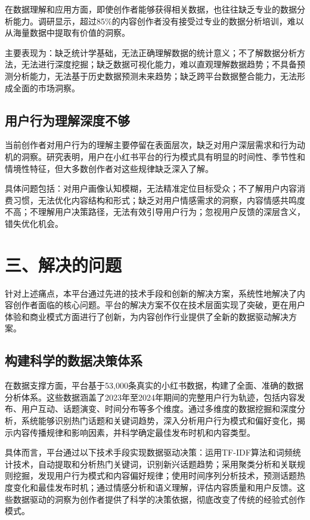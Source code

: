 \documentclass[12pt,a4paper]{article}
\begin{document}
在数据理解和应用方面，即使创作者能够获得相关数据，也往往缺乏专业的数据分析能力。调研显示，超过85\%的内容创作者没有接受过专业的数据分析培训，难以从海量数据中提取有价值的洞察。

主要表现为：缺乏统计学基础，无法正确理解数据的统计意义；不了解数据分析方法，无法进行深度挖掘；缺乏数据可视化能力，难以直观理解数据趋势；不具备预测分析能力，无法基于历史数据预测未来趋势；缺乏跨平台数据整合能力，无法形成全面的市场洞察。

\subsection{用户行为理解深度不够}

当前创作者对用户行为的理解主要停留在表面层次，缺乏对用户深层需求和行为动机的洞察\cite{user-behavior-analysis}。研究表明，用户在小红书平台的行为模式具有明显的时间性、季节性和情境性特征，但大多数创作者对这些规律缺乏深入了解。

具体问题包括：对用户画像认知模糊，无法精准定位目标受众；不了解用户内容消费习惯，无法优化内容结构和形式；缺乏对用户情感需求的洞察，内容情感共鸣度不高；不理解用户决策路径，无法有效引导用户行为；忽视用户反馈的深层含义，错失优化机会。

\section*{三、解决的问题}
\setcounter{section}{3}

针对上述痛点，本平台通过先进的技术手段和创新的解决方案，系统性地解决了内容创作者面临的核心问题。平台的解决方案不仅在技术层面实现了突破，更在用户体验和商业模式方面进行了创新，为内容创作行业提供了全新的数据驱动解决方案。

\subsection{构建科学的数据决策体系}

在数据支撑方面，平台基于53,000条真实的小红书数据，构建了全面、准确的数据分析体系。这些数据涵盖了2023年至2024年期间的完整用户行为轨迹，包括内容发布、用户互动、话题演变、时间分布等多个维度。通过多维度的数据挖掘和深度分析，系统能够识别热门话题和关键词趋势，深入分析用户行为模式和偏好变化，揭示内容传播规律和影响因素，并科学确定最佳发布时机和内容类型。

具体而言，平台通过以下技术手段实现数据驱动决策：运用TF-IDF算法和词频统计技术，自动提取和分析热门关键词，识别新兴话题趋势；采用聚类分析和关联规则挖掘，发现用户行为模式和内容偏好规律；使用时间序列分析技术，预测话题热度变化和最佳发布时机；通过情感分析和语义理解，评估内容质量和用户反馈。这些数据驱动的洞察为创作者提供了科学的决策依据，彻底改变了传统的经验式创作模式。
\end{document}
